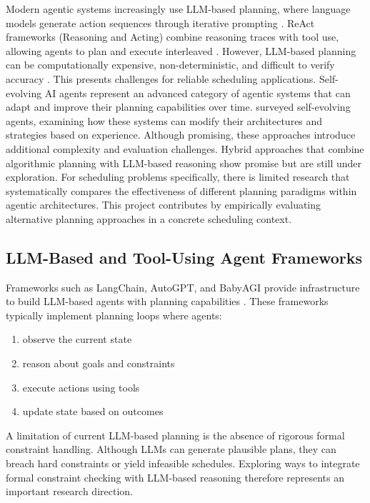 \documentclass[12pt]{article}
\begin{document}
Modern agentic systems increasingly use LLM-based planning, where language models generate action sequences through iterative prompting \parencite{sun2023adaplanner}. ReAct frameworks (Reasoning and Acting) combine reasoning traces with tool use, allowing agents to plan and execute interleaved \parencite{yao2022react}. However, LLM-based planning can be computationally expensive, non-deterministic, and difficult to verify accuracy \parencite{aghzal2025survey}\parencite{katz2024thought}\parencite{lee2025veriplan}. This presents challenges for reliable scheduling applications. 
Self-evolving AI agents represent an advanced category of agentic systems that can adapt and improve their planning capabilities over time. \parencite{fang2025comprehensive} surveyed self-evolving agents, examining how these systems can modify their architectures and strategies based on experience. Although promising, these approaches introduce additional complexity and evaluation challenges.
Hybrid approaches that combine algorithmic planning with LLM-based reasoning show promise but are still under exploration. For scheduling problems specifically, there is limited research that systematically compares the effectiveness of different planning paradigms within agentic architectures. This project contributes by empirically evaluating alternative planning approaches in a concrete scheduling context.


\subsection{LLM-Based and Tool-Using Agent Frameworks}

Frameworks such as LangChain, AutoGPT, and BabyAGI provide infrastructure to build LLM-based agents with planning capabilities \parencite{chase2022langchain}. These frameworks typically implement planning loops where agents: 
\begin{enumerate}
    \item observe the current state
    \item reason about goals and constraints
    \item execute actions using tools
    \item update state based on outcomes
\end{enumerate}

A limitation of current LLM-based planning is the absence of rigorous formal constraint handling. Although LLMs can generate plausible plans, they can breach hard constraints or yield infeasible schedules. Exploring ways to integrate formal constraint checking with LLM-based reasoning therefore represents an important research direction. \parencite{aghzal2025survey}
\end{document}
